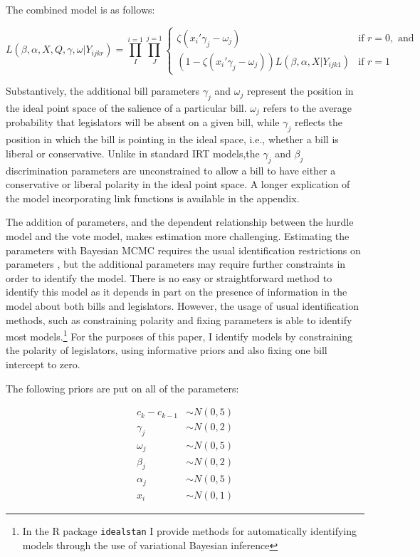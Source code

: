 	The combined model is as follows:
	
		 \[
	L(\beta,\alpha,X,Q,\gamma,\omega|Y_{ijkr}) = 
	\prod_{I}^{i=1} \prod_{J}^{j=1}
	\begin{cases}
	\zeta(x_{i}'\gamma_j - \omega_j ) & \text{if } r=0, \text{ and} \\
	(1-\zeta({x_{i}'\gamma_j - \omega_j}))L(\beta,\alpha,X|Y_{ijk1}) & \text{if } r=1
	\end{cases}
	\]
	
	Substantively, the additional bill parameters $\gamma_j$ and $\omega_j$ represent the position in the ideal point space of the salience of a particular bill. $\omega_j$ refers to the average probability that legislators will be absent on a given bill, while $\gamma_j$ reflects the position in which the bill is pointing in the ideal space, i.e., whether a bill is liberal or conservative. Unlike in standard IRT models,the $\gamma_j$ and $\beta_j$ discrimination parameters are unconstrained to allow a bill to have either a conservative or liberal polarity in the ideal point space. A longer explication of the model incorporating link functions is available in the appendix. 
	
	The addition of parameters, and the dependent relationship between the hurdle model and the vote model, makes estimation more challenging. Estimating the parameters with Bayesian MCMC requires the usual identification restrictions on parameters \parencite{jackman2004,gelman2005}, but the additional parameters may require further constraints in order to identify the model. There is no easy or straightforward method to identify this model as it depends in part on the presence of information in the model about both bills and legislators. However, the usage of usual identification methods, such as constraining polarity and fixing parameters is able to identify most models.\footnote{In the R package \texttt{idealstan} I provide methods for automatically identifying models through the use of variational Bayesian inference} For the purposes of this paper, I identify models by constraining the polarity of legislators, using informative priors and also fixing one bill intercept to zero.
	
	The following priors are put on all of the parameters:
	
	\begin{align*}
		c_k - c_{k-1} &\sim N(0,5)\\
		\gamma_j &\sim N(0,2)\\
		\omega_j &\sim N(0,5)\\
		\beta_j &\sim N(0,2)\\
		\alpha_j &\sim N(0,5)\\
		x_i &\sim N(0,1)
	\end{align*}

